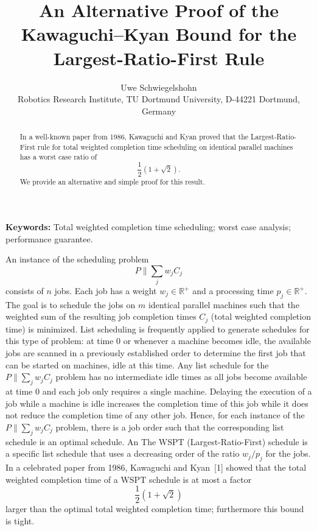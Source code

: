 \documentclass[11pt]{article}
\begin{document}
\title{An Alternative Proof of the Kawaguchi--Kyan Bound for the
Largest-Ratio-First Rule}
\author{Uwe Schwiegelshohn\\
\small Robotics Research Institute, TU Dortmund University, D-44221 Dortmund, Germany}
\date{}
\maketitle

\begin{abstract}
In a well-known paper from 1986, Kawaguchi and Kyan proved that the
Largest-Ratio-First rule for total weighted completion time scheduling on
identical parallel machines has a worst case ratio of
\[
        \frac12(1+\sqrt{2}).
\]
We provide an alternative and simple proof for this result.
\end{abstract}

\noindent\textbf{Keywords:}
Total weighted completion time scheduling; worst case analysis; performance
guarantee.

\bigskip

An instance of the scheduling problem
\[
        P\|\sum_j w_j C_j
\]
consists of $n$ jobs. Each job has a weight $w_j \in \mathbb{R}^+$ and a
processing time $p_j \in \mathbb{R}^+$. The goal is to schedule the jobs on
$m$ identical parallel machines such that the weighted sum of the resulting
job completion times $C_j$ (total weighted completion time) is minimized.
List scheduling is frequently applied to generate schedules for this type of
problem: at time 0 or whenever a machine becomes idle, the available jobs are
scanned in a previously established order to determine the first job that can
be started on machines, idle at this time. Any list schedule for the
$P\|\sum_j w_j C_j$ problem has no intermediate idle times as all jobs become
available at time 0 and each job only requires a single machine. Delaying the
execution of a job while a machine is idle increases the completion time of
this job while it does not reduce the completion time of any other job.
Hence, for each instance of the $P\|\sum_j w_j C_j$ problem, there is a job
order such that the corresponding list schedule is an optimal schedule. An
The \(\mathrm{WSPT}\) (Largest-Ratio-First) schedule is a specific list schedule that uses a
decreasing order of the ratio $w_j/p_j$ for the jobs. In a celebrated paper
from 1986, Kawaguchi and Kyan~[1] showed that the total weighted completion
time of a \(\mathrm{WSPT}\) schedule is at most a factor
\[
        \frac12(1+\sqrt{2})
\]
larger than the optimal total weighted completion time; furthermore this
bound is tight.
\end{document}
